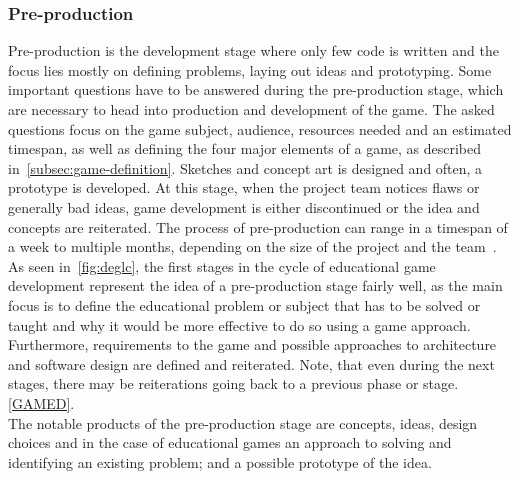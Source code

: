 \subsubsection{Pre-production}\label{subsubsec:pre-production}
Pre-production is the development stage where only few code is written and the focus lies mostly on defining
problems, laying out ideas and prototyping.
Some important questions have to be answered during the pre-production stage, which are necessary to
head into production and development of the game.
The asked questions focus on the game subject, audience, resources needed and an estimated timespan, as well as
defining the four major elements of a game, as described in~\ref{subsec:game-definition}.
Sketches and concept art is designed and often, a prototype is developed.
At this stage, when the project team notices flaws or generally bad ideas, game development is either discontinued or the idea and concepts are
reiterated.
The process of pre-production can range in a timespan of a week to multiple months, depending on the size of the project and
the team~\cite{cg:game-design-stages}.
\\
As seen in~\ref{fig:deglc}, the first stages in the cycle of educational game development represent the idea of a pre-production stage fairly well,
as the main focus is to define the educational problem or subject that has to be solved or taught and why it would be more effective
to do so using a game approach.
Furthermore, requirements to the game and possible approaches to architecture and software design are defined and reiterated.
Note, that even during the next stages, there may be reiterations going back to a previous phase or stage.\ref{GAMED}.
\\
The notable products of the pre-production stage are concepts, ideas, design choices and in the case of educational games an approach to solving and identifying
an existing problem;
and a possible prototype of the idea.

